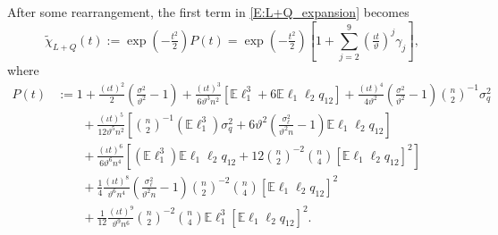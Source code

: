 \documentclass[11pt]{article}
\numberwithin{equation}{section}
\theoremstyle{definition}
\newcommand{\E}{\mathbb{E}}
\newcommand{\Scale}{\vartheta}
\begin{document}
After some rearrangement, the first term in \eqref{E:L+Q_expansion} becomes
\begin{equation*}
\widetilde{\chi}_{L+Q}(t):= \exp\left(-\tfrac{t^2}{2}\right)P(t)  =  \exp\left(-\tfrac{t^2}{2}\right)\left[1 + \sum_{j=2}^9 \left(\tfrac{\iota t}{\Scale}\right)^j\gamma_j \right],
\end{equation*}
where 
\begin{align*}
    P(t)&:=1 + \tfrac{(\iota t)^2}{2}\left(\tfrac{\sigma^2}{\Scale^2}-1\right) + \tfrac{(\iota t)^3}{6\Scale^3n^2}\left[\E \ell_1^3 + 6\E\ell_1\ell_2q_{12} \right] + \tfrac{(\iota t)^4}{4\Scale^2}\left(\tfrac{\sigma^2}
{\Scale^2}-1\right)\binom{n}{2}^{-1} \sigma_q^2\\
    &\qquad + \tfrac{(\iota t)^5}{12\Scale^5 n^2}\left[\binom{n}{2}^{-1}(\E\ell_1^3 )\sigma_q^2 + 6\Scale^2\left(\tfrac{\sigma_\ell^2}{\Scale^2 n}-1\right)\E\ell_1\ell_2q_{12}\right] \\
    &\qquad + \tfrac{(\iota t)^6}{6\Scale^6n^4}\left[(\E\ell_1^3)\E\ell_1\ell_2q_{12} + 12\binom{n}{2}^{-2}\binom{n}{4} \left[\E\ell_1\ell_2q_{12}\right]^ 2\right]\\
&\qquad + \tfrac{1}{4}\tfrac{(\iota t)^8}{\Scale^6n^4}\left(\tfrac{\sigma_\ell^2}{\Scale^2 n}-1\right)\binom{n}{2}^{-2}\binom{n}{4} \left[\E\ell_1\ell_2q_{12}\right]^2\\
&\qquad + \tfrac{1}{12}\tfrac{(\iota t)^9}{\Scale^9n^6}\binom{n}{2}^{-2}\binom{n}{4} \E\ell_1^3\left[\E\ell_1\ell_2q_{12}\right]^ 2.
\end{align*}

%

\end{document}
